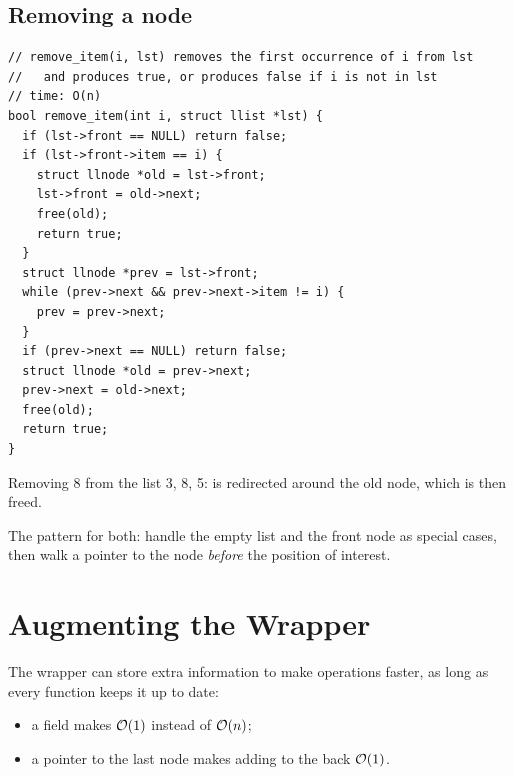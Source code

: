 \subsection{Removing a node}
\begin{lstlisting}[style=c]
// remove_item(i, lst) removes the first occurrence of i from lst
//   and produces true, or produces false if i is not in lst
// time: O(n)
bool remove_item(int i, struct llist *lst) {
  if (lst->front == NULL) return false;
  if (lst->front->item == i) {
    struct llnode *old = lst->front;
    lst->front = old->next;
    free(old);
    return true;
  }
  struct llnode *prev = lst->front;
  while (prev->next && prev->next->item != i) {
    prev = prev->next;
  }
  if (prev->next == NULL) return false;
  struct llnode *old = prev->next;
  prev->next = old->next;
  free(old);
  return true;
}
\end{lstlisting}
Removing 8 from the list 3, 8, 5:  is redirected around the
old node, which is then freed.

\begin{center}
\end{center}

The pattern for both: handle the empty list and the front node as special cases, then walk a
 pointer to the node \emph{before} the position of interest.

\section{Augmenting the Wrapper}

The wrapper can store extra information to make operations faster, as long as every function
keeps it up to date:
\begin{itemize}
  \item a  field makes  $\mathcal{O}(1)$ instead of $\mathcal{O}(n)$;
  \item a  pointer to the last node makes adding to the back $\mathcal{O}(1)$.
\end{itemize}

